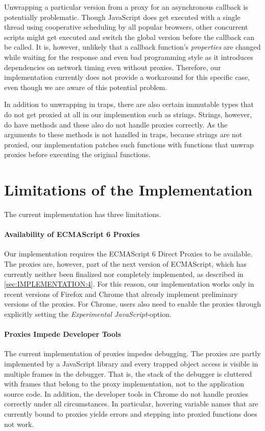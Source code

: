 Unwrapping a particular version from a proxy for an asynchronous callback is potentially problematic.
Though JavaScript does get executed with a single thread using cooperative scheduling by all popular browsers, other concurrent scripts might get executed and switch the global version before the callback can be called.
It is, however, unlikely that a callback function's \emph{properties} are changed while waiting for the response and even bad programming style as it introduces dependencies on network timing even without proxies.
Therefore, our implementation currently does not provide a workaround for this specific case, even though we are aware of this potential problem. 

In addition to unwrapping in traps, there are also certain immutable types that do not get proxied at all in our implemention such as strings.
Strings, however, do have methods and these also do not handle proxies correctly.
As the arguments to these methods is not handled in traps, because strings are not proxied, our implementation patches such functions with functions that unwrap proxies before executing the original functions.





\section{Limitations of the Implementation}

The current implementation has three limitations.

\paragraph{Availability of ECMAScript 6 Proxies}
Our implementation requires the ECMAScript 6 Direct Proxies to be available.
The proxies are, however, part of the next version of ECMAScript, which has currently neither been finalized nor completely implemented, as described in \ref{sec:IMPLEMENTATION:4}.
For this reason, our implementation works only in recent versions of Firefox and Chrome that already implement preliminary versions of the proxies.
For Chrome, users also need to enable the proxies through explicitly setting the \emph{Experimental JavaScript}-option.

\paragraph{Proxies Impede Developer Tools}
The current implementation of proxies impedes debugging.
The proxies are partly implemented by a JavaScript library and every trapped object access is visible in multiple frames in the debugger.
That is, the stack of the debugger is cluttered with frames that belong to the proxy implementation, not to the application source code.
In addition, the developer tools in Chrome do not handle proxies correctly under all circumstances.
In particular, hovering variable names that are currently bound to proxies yields errors and stepping into proxied functions does not work.

